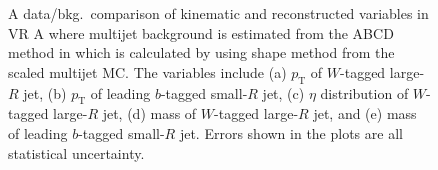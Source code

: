\begin{figure}[hbt!]
\begin{subfigure}{.35\textwidth}
		\caption{}
		\label{fig:abcd:furtherimprovement:scaledcorr:jet_m}
	\end{subfigure}
	\caption{A data/bkg.\ comparison of kinematic and reconstructed variables in VR A where multijet background is estimated from the ABCD method in which \R is calculated by using shape method from the scaled multijet MC. The variables include (a) $p_{\text{T}}$ of $W$-tagged large-$R$ jet, (b) $p_{\text{T}}$ of leading $b$-tagged small-$R$ jet, (c) $\eta$ distribution of $W$-tagged large-$R$ jet, (d) mass of $W$-tagged large-$R$ jet, and (e) mass of leading $b$-tagged small-$R$ jet. Errors shown in the plots are all statistical uncertainty.}
	\label{fig:abcd:furtherimprovement:scaledcorr}
\end{figure}


